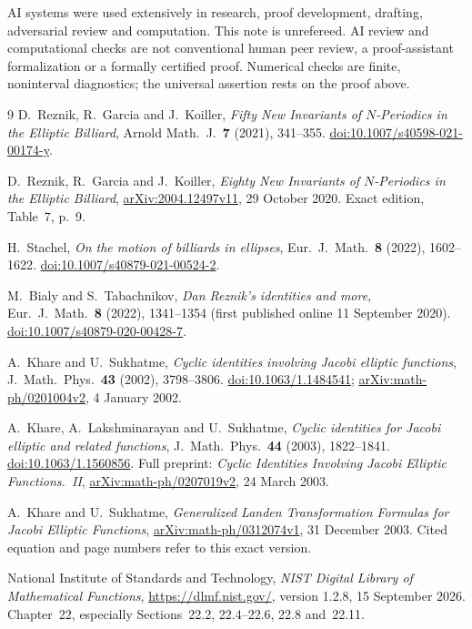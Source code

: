 \documentclass[11pt]{article}
\begin{document}
AI systems were used extensively in research, proof development,
drafting, adversarial review and computation. This note is unrefereed.
AI review and computational checks are not conventional human peer
review, a proof-assistant formalization or a formally certified proof.
Numerical checks are finite, noninterval diagnostics; the universal
assertion rests on the proof above.

\begin{thebibliography}{9}
D.~Reznik, R.~Garcia and J.~Koiller,
\emph{Fifty New Invariants of \(N\)-Periodics in the Elliptic Billiard},
Arnold Math.\ J.\ \textbf{7} (2021), 341--355.
\href{https://doi.org/10.1007/s40598-021-00174-y}
{doi:10.1007/s40598-021-00174-y}.

D.~Reznik, R.~Garcia and J.~Koiller,
\emph{Eighty New Invariants of \(N\)-Periodics in the Elliptic Billiard},
\href{https://arxiv.org/abs/2004.12497v11}{arXiv:2004.12497v11},
29 October 2020. Exact edition, Table~7, p.~9.

H.~Stachel, \emph{On the motion of billiards in ellipses},
Eur.\ J.\ Math.\ \textbf{8} (2022), 1602--1622.
\href{https://doi.org/10.1007/s40879-021-00524-2}
{doi:10.1007/s40879-021-00524-2}.

M.~Bialy and S.~Tabachnikov,
\emph{Dan Reznik's identities and more},
Eur.\ J.\ Math.\ \textbf{8} (2022), 1341--1354
(first published online 11 September 2020).
\href{https://doi.org/10.1007/s40879-020-00428-7}
{doi:10.1007/s40879-020-00428-7}.

A.~Khare and U.~Sukhatme,
\emph{Cyclic identities involving Jacobi elliptic functions},
J.\ Math.\ Phys.\ \textbf{43} (2002), 3798--3806.
\href{https://doi.org/10.1063/1.1484541}{doi:10.1063/1.1484541};
\href{https://arxiv.org/abs/math-ph/0201004v2}
{arXiv:math-ph/0201004v2}, 4 January 2002.

A.~Khare, A.~Lakshminarayan and U.~Sukhatme,
\emph{Cyclic identities for Jacobi elliptic and related functions},
J.\ Math.\ Phys.\ \textbf{44} (2003), 1822--1841.
\href{https://doi.org/10.1063/1.1560856}{doi:10.1063/1.1560856}.
Full preprint: \emph{Cyclic Identities Involving Jacobi Elliptic
Functions.~II},
\href{https://arxiv.org/abs/math-ph/0207019v2}
{arXiv:math-ph/0207019v2}, 24 March 2003.

A.~Khare and U.~Sukhatme,
\emph{Generalized Landen Transformation Formulas for Jacobi Elliptic
Functions},
\href{https://arxiv.org/abs/math-ph/0312074v1}
{arXiv:math-ph/0312074v1}, 31 December 2003.
Cited equation and page numbers refer to this exact version.

National Institute of Standards and Technology,
\emph{NIST Digital Library of Mathematical Functions},
\href{https://dlmf.nist.gov/}{https://dlmf.nist.gov/},
version 1.2.8, 15 September 2026.
Chapter~22, especially Sections~22.2, 22.4--22.6, 22.8 and~22.11.
\end{thebibliography}
\end{document}
